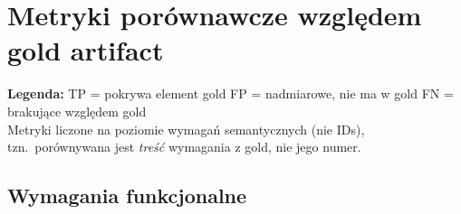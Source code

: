 \documentclass[12pt,a4paper]{article}
\newcommand{\tp}[1]{\colorbox{tpcolor}{\small #1}}
\newcommand{\fp}[1]{\colorbox{fpcolor}{\small #1}}
\newcommand{\fn}[1]{\colorbox{fncolor}{\small #1}}
\begin{document}
\newpage

\section{Metryki porównawcze względem gold artifact}

\begin{mdframed}[backgroundcolor=metabg, linewidth=0pt, innerleftmargin=10pt, innerrightmargin=10pt, innertopmargin=8pt, innerbottommargin=8pt]
\small
\textbf{Legenda:} \tp{TP} = pokrywa element gold \quad \fp{FP} = nadmiarowe, nie ma w gold \quad \fn{FN} = brakujące względem gold\\[0.3em]
Metryki liczone na poziomie wymagań semantycznych (nie IDs), tzn.\ porównywana jest \textit{treść} wymagania z gold, nie jego numer.
\end{mdframed}

\vspace{0.8em}

\subsection{Wymagania funkcjonalne}
\end{document}
